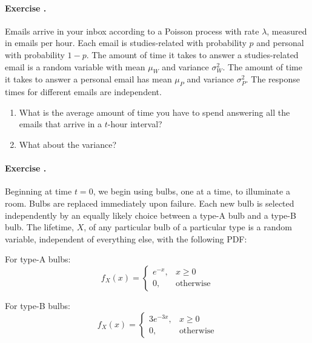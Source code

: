 \documentclass[twocolumn,12pt,a4paper]{article}
\newcounter{num}  %
\begin{document}
	
	
	\paragraph{Exercise \thenum.}
	Emails arrive in your inbox according to a Poisson process with rate $\lambda$, measured in emails per hour.
	Each email is studies-related with probability $p$ and personal with probability $1 - p$. 
	The amount of time it takes to answer a studies-related email is a random variable with mean $\mu_W$ and variance $\sigma_W^2$. 
	The amount of time it takes to answer a personal email has mean $\mu_P$ and variance $\sigma_P^2$.
	The response times for different emails are independent.
	\begin{enumerate}
	\item What is the average amount of time you have to spend answering all the emails that arrive in a $t$-hour interval? 
	\item What about the variance?
		\end{enumerate}
	
	
	
	
	
	\paragraph{Exercise \thenum.}
	Beginning at time $ t = 0 $, we begin using bulbs, one at a time, to illuminate a room. Bulbs are replaced immediately upon failure. Each new bulb is selected independently by an equally likely choice between a type-A bulb and a type-B bulb. The lifetime, $ X $, of any particular bulb of a particular type is a random variable, independent of everything else, with the following PDF:
	
	For type-A bulbs:
	\[
	f_X(x) = 
	\begin{cases}
		e^{-x}, & x \geq 0 \\
		0, & \text{otherwise}
	\end{cases}
	\]
	
	For type-B bulbs:
	\[
	f_X(x) = 
	\begin{cases}
		3e^{-3x}, & x \geq 0 \\
		0, & \text{otherwise}
	\end{cases}
	\]
	
\end{document}
